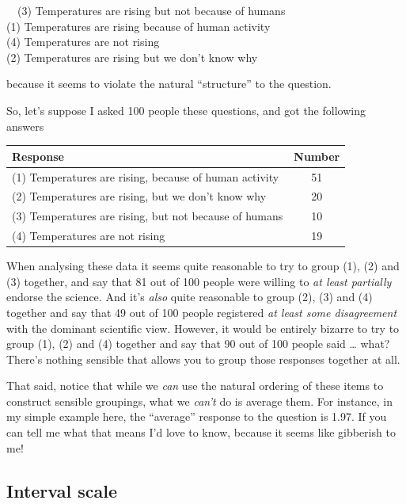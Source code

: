 \documentclass[
]{book}
\begin{document}
~~(3) Temperatures are rising but not because of humans\\
\hspace*{0.333em}\hspace*{0.333em}(1) Temperatures are rising because of human activity\\
\hspace*{0.333em}\hspace*{0.333em}(4) Temperatures are not rising\\
\hspace*{0.333em}\hspace*{0.333em}(2) Temperatures are rising but we don't know why

\hfill\break
because it seems to violate the natural ``structure'' to the question.

So, let's suppose I asked 100 people these questions, and got the following answers

\begin{longtable}[]{@{}lc@{}}
\toprule
Response & Number\tabularnewline
\midrule
\endhead
(1) Temperatures are rising, because of human activity & 51\tabularnewline
(2) Temperatures are rising, but we don't know why & 20\tabularnewline
(3) Temperatures are rising, but not because of humans & 10\tabularnewline
(4) Temperatures are not rising & 19\tabularnewline
\bottomrule
\end{longtable}

\hfill\break
When analysing these data it seems quite reasonable to try to group (1), (2) and (3) together, and say that 81 out of 100 people were willing to \emph{at least partially} endorse the science. And it's \emph{also} quite reasonable to group (2), (3) and (4) together and say that 49 out of 100 people registered \emph{at least some disagreement} with the dominant scientific view. However, it would be entirely bizarre to try to group (1), (2) and (4) together and say that 90 out of 100 people said \ldots{} what? There's nothing sensible that allows you to group those responses together at all.

That said, notice that while we \emph{can} use the natural ordering of these items to construct sensible groupings, what we \emph{can't} do is average them. For instance, in my simple example here, the ``average'' response to the question is 1.97. If you can tell me what that means I'd love to know, because it seems like gibberish to me!

\hypertarget{interval-scale}{%
\subsection{Interval scale}\label{interval-scale}}
\end{document}
